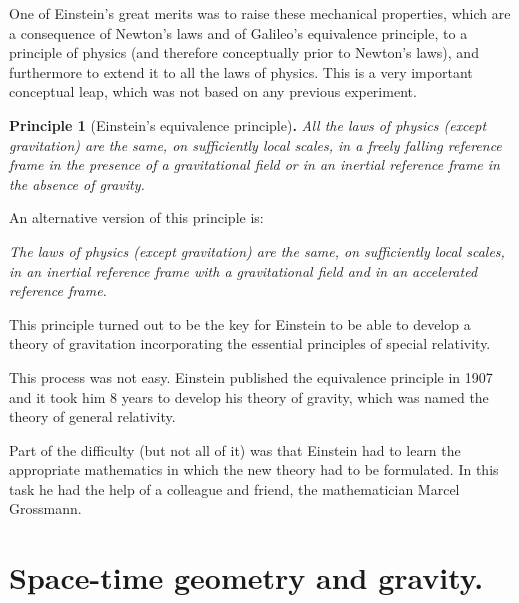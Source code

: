 \begin{points}
\item One of Einstein's great merits was to raise these mechanical properties, which are a consequence of Newton's laws and of Galileo's equivalence principle, to a principle of physics (and therefore conceptually prior to Newton's laws), and furthermore to extend it to all the laws of physics. This is a very important conceptual leap, which was not based on any previous experiment.
\end{points}

\textbf{Principle 1} (Einstein's equivalence principle)\textbf{.} \emph{All the laws of physics (except gravitation) are the same, on sufficiently local scales, in a freely falling reference frame in the presence of a gravitational field or in an inertial reference frame in the absence of gravity.}

An alternative version of this principle is:

\emph{The laws of physics (except gravitation) are the same, on sufficiently local scales, in an inertial reference frame with a gravitational field and in an accelerated reference frame.}

\begin{points}
\item This principle turned out to be the key for Einstein to be able to develop a theory of gravitation incorporating the essential principles of special relativity.

This process was not easy. Einstein published the equivalence principle in 1907 and it took him 8 years to develop his theory of gravity, which was named the theory of general relativity.

\item Part of the difficulty (but not all of it) was that Einstein had to learn the appropriate mathematics in which the new theory had to be formulated. In this task he had the help of a colleague and friend, the mathematician Marcel Grossmann.
\end{points}

\section{Space-time geometry and gravity.}

